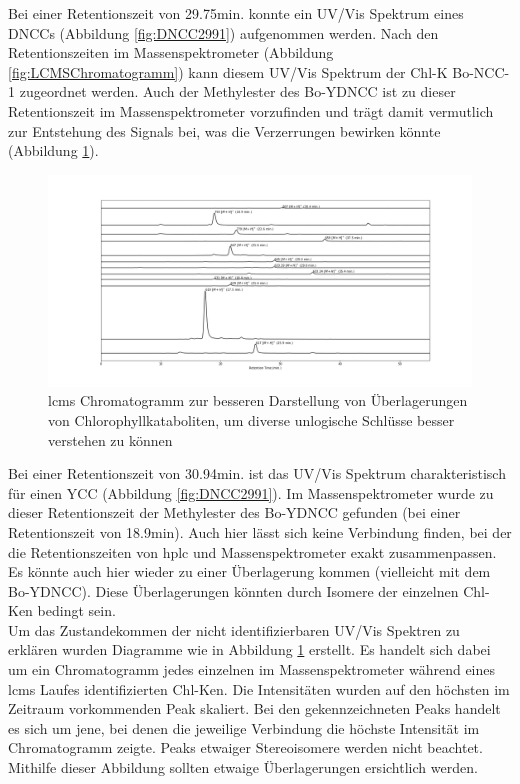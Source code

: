 Bei einer Retentionszeit von 29.75min. konnte ein UV/Vis Spektrum eines \gls{DNCC}s (Abbildung \ref{fig:DNCC2991}) aufgenommen werden. Nach den Retentionszeiten im Massenspektrometer (Abbildung \ref{fig:LCMSChromatogramm}) kann diesem UV/Vis Spektrum der \gls{Chl-K} Bo-NCC-1 zugeordnet werden. Auch der Methylester des Bo-YDNCC ist zu dieser Retentionszeit im Massenspektrometer vorzufinden und trägt damit vermutlich zur Entstehung des Signals bei, was die Verzerrungen bewirken könnte (Abbildung \ref{fig:LCMSChromatogrammAufspaltung}).

\begin{figure}[!htbp]
  \includegraphics[width=1.4\textwidth, center]{figures/Kapitel6/keineReaktion/Kuerbis_Analyse_keineReaktion2_LC-ESI-MS.png}
  \caption[LC-MS Chromatogramm vor der Reaktion - Aufspaltung der Signale, Quelle: Autor]{\gls{lcms} Chromatogramm zur besseren Darstellung von Überlagerungen von Chlorophyllkataboliten, um diverse unlogische Schlüsse besser verstehen zu können}
  \label{fig:LCMSChromatogrammAufspaltung}
\end{figure}

Bei einer Retentionszeit von 30.94min. ist das UV/Vis Spektrum charakteristisch für einen \gls{YCC} (Abbildung \ref{fig:DNCC2991}). Im Massenspektrometer wurde zu dieser Retentionszeit der Methylester des Bo-YDNCC gefunden (bei einer Retentionszeit von 18.9min). Auch hier lässt sich keine Verbindung finden, bei der die Retentionszeiten von \gls{hplc} und Massenspektrometer exakt zusammenpassen. Es könnte auch hier wieder zu einer Überlagerung kommen (vielleicht mit dem Bo-YDNCC). Diese Überlagerungen könnten durch Isomere der einzelnen \gls{Chl-K}en bedingt sein. \\
 

Um das Zustandekommen der nicht identifizierbaren UV/Vis Spektren zu erklären wurden Diagramme wie in Abbildung \ref{fig:LCMSChromatogrammAufspaltung} erstellt. Es handelt sich dabei um ein Chromatogramm jedes einzelnen im Massenspektrometer während eines \gls{lcms} Laufes identifizierten \gls{Chl-K}en. Die Intensitäten wurden auf den höchsten im Zeitraum vorkommenden Peak skaliert. Bei den gekennzeichneten Peaks handelt es sich um jene, bei denen die jeweilige Verbindung die höchste Intensität im Chromatogramm zeigte. Peaks etwaiger Stereoisomere werden nicht beachtet. Mithilfe dieser Abbildung sollten etwaige Überlagerungen ersichtlich werden. 

